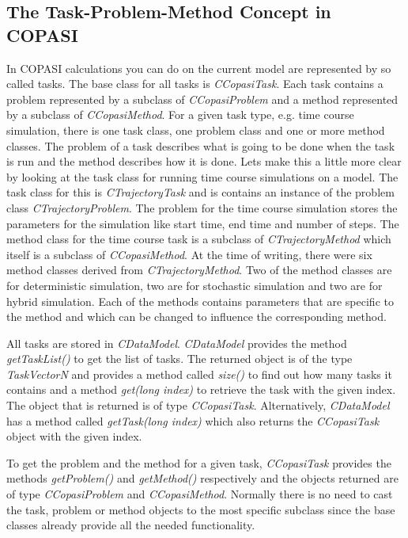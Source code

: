 \documentclass[a4,10pt]{article}
\begin{document}
\subsection{The Task-Problem-Method Concept in COPASI}
In COPASI calculations you can do on the current model are represented by so called tasks. The base class for all tasks is \textit{CCopasiTask}. Each task contains a problem represented by a subclass of \textit{CCopasiProblem} and a method represented by a subclass of \textit{CCopasiMethod}.
For a given task type, e.g. time course simulation, there is one task class, one problem class and one or more method classes. The problem of a task describes what is going to be done when the task is run and the method describes how it is done.
Lets make this a little more clear by looking at the task class for running time course simulations on a model. The task class for this is \textit{CTrajectoryTask} and is contains an instance of the problem class \textit{CTrajectoryProblem}. The problem for the time course simulation stores the parameters for the simulation like start time, end time and number of steps. The method class for the time course task is a subclass of \textit{CTrajectoryMethod} which itself is a subclass of \textit{CCopasiMethod}. At the time of writing, there were six method classes derived from \textit{CTrajectoryMethod}. Two of the method classes are for deterministic simulation, two are for stochastic simulation and two are for hybrid simulation. Each of the methods contains parameters that are specific to the method and which can be changed to influence the corresponding method.

All tasks are stored in \textit{CDataModel}. \textit{CDataModel} provides the method \textit{getTaskList()} to get the list of tasks. The returned object is of the type \textit{TaskVectorN} and provides a method called \textit{size()} to find out how many tasks it contains and a method \textit{get(long index)} to retrieve the task with the given index. The object that is returned is of type \textit{CCopasiTask}. Alternatively, \textit{CDataModel} has a method called \textit{getTask(long index)} which also returns the \textit{CCopasiTask} object with the given index.

To get the problem and the method for a given task, \textit{CCopasiTask} provides the methods \textit{getProblem()} and \textit{getMethod()} respectively and the objects returned are of type \textit{CCopasiProblem} and \textit{CCopasiMethod}. Normally there is no need to cast the task, problem or method objects to the most specific subclass since the base classes already provide all the needed functionality.
\end{document}
